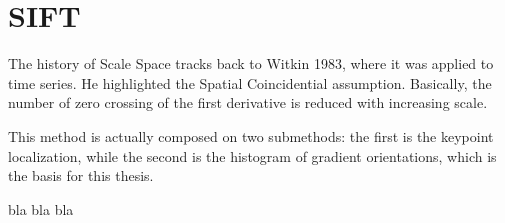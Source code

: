 \chapter{SIFT}

The history of Scale Space tracks back to Witkin 1983, where it was applied to time series.  He highlighted the Spatial Coincidential assumption.
Basically, the number of zero crossing of the first derivative is reduced with increasing scale.

\begin{story}

\end{story}

This method is actually composed on two submethods: the first is the keypoint localization, while the second is the histogram of gradient orientations, which is the basis for this thesis.

bla bla bla

